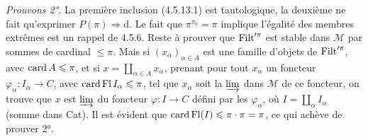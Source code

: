 \textit{Prouvons 2°.} La première inclusion (4.5.13.1) est tautologique, la deuxième ne fait qu'exprimer $P(\pi) \Longrightarrow \mathrm{d}$. Le fait que $\pi^{\pi_0} = \pi$ implique l'égalité des membres extrêmes est un rappel de 4.5.6. Reste à prouver que $\operatorname{Filt}'^{\pi}$ est stable dans $\mathcal{M}$ par sommes de cardinal $\leqslant \pi$. Mais si $(x_{\alpha})_{\alpha\in A}$ est une famille d'objets de $\operatorname{Filt}'^{\pi}$, avec $\operatorname{card} A \leqslant \pi$, et si $x = \coprod_{\alpha\in A} x_{\alpha}$, prenant pour tout $x_{\alpha}$ un foncteur $\varphi_{\alpha} : I_{\alpha} \longrightarrow C$, avec $\operatorname{card} \operatorname{Fl} I_{\alpha} \leqslant \pi$, tel que $x_{\alpha}$ soit la $\varinjlim$ dans $\mathcal{M}$ de ce foncteur, on trouve que $x$ est $\varinjlim$ du foncteur $\varphi : I \longrightarrow C$ défini par les $\varphi_{\alpha}$, où $I = \coprod_{\alpha} I_{\alpha}$ (somme dans Cat). Il est évident que $\operatorname{card} \operatorname{Fl}(I) \leqslant \pi\cdot\pi = \pi$, ce qui achève de prouver 2°.

